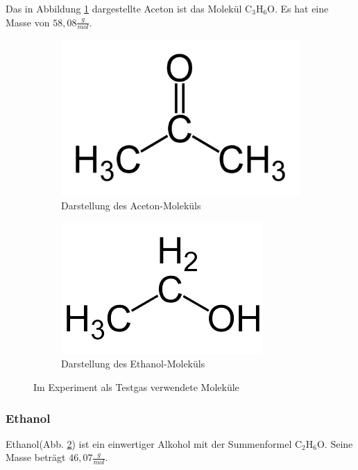 \documentclass[10pt,a4paper]{article}
\begin{document}
Das in Abbildung \ref{aceton1} dargestellte Aceton ist das Molekül C$_3$H$_6$O. Es hat eine Masse von $58,08 \frac{g}{mol}$.

\begin{figure}[h]
	\centering
	\begin{subfigure}{0.45\textwidth}
		\centering
		\includegraphics[scale = 0.15]{aceton.png}
		\caption{Darstellung des Aceton-Moleküls}
		\label{aceton1}
	\end{subfigure}
	\begin{subfigure}{0.45\textwidth}
		\centering
		\includegraphics[scale = 0.5]{ethanol.png}
		\caption{Darstellung des Ethanol-Moleküls}
		\label{ethanol1}
	\end{subfigure}
	\caption{Im Experiment als Testgas verwendete Moleküle}
	\label{proben1}
\end{figure}

\subsubsection{Ethanol}

Ethanol(Abb. \ref{ethanol1}) ist ein einwertiger Alkohol mit der Summenformel C$_2$H$_6$O. Seine Masse beträgt $46,07 \frac{g}{mol}$.
\end{document}
